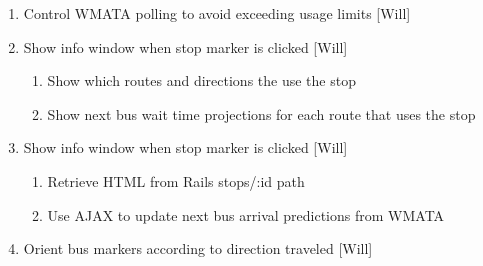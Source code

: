 \documentclass[12pt]{report}
\begin{document}
\begin{description}
\begin{enumerate}
    \item Control WMATA polling to avoid exceeding usage limits [Will]
    \item Show info window when stop marker is clicked [Will]
      \begin{enumerate}
        \item Show which routes and directions the use the stop
        \item Show next bus wait time projections for each route that uses the stop
      \end{enumerate}
    \item Show info window when stop marker is clicked [Will]
    \begin{enumerate}
      \item Retrieve HTML from Rails stops/:id path
      \item Use AJAX to update next bus arrival predictions from WMATA
    \end{enumerate}
    \item Orient bus markers according to direction traveled [Will]
  \end{enumerate}
\end{description}

\printbibliography
\end{document}
